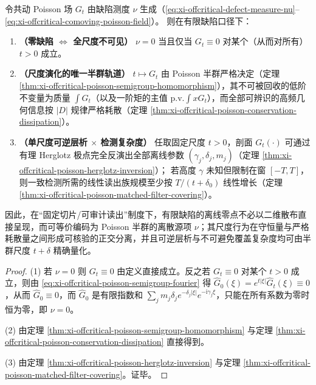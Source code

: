 \begin{corollary}\label{cor:xi-offcritical-poisson-field-classification}
令共动 Poisson 场 \(G_t\) 由缺陷测度 \(\nu\) 生成（\eqref{eq:xi-offcritical-defect-measure-nu}--\eqref{eq:xi-offcritical-comoving-poisson-field}）。
则在有限缺陷口径下：
\begin{enumerate}
  \item \textbf{（零缺陷 \(\Leftrightarrow\) 全尺度不可见）}
  \(\nu=0\) 当且仅当 \(G_t\equiv 0\) 对某个（从而对所有）\(t>0\) 成立。
  \item \textbf{（尺度演化的唯一半群轨道）}
  \(t\mapsto G_t\) 由 Poisson 半群严格决定（定理 \ref{thm:xi-offcritical-poisson-semigroup-homomorphism}），其不可被回收的低阶不变量为质量 \(\int G_t\)（以及一阶矩的主值 \(\mathrm{p.v.}\int xG_t\)），而全部可辨识的高频几何信息按 \(|D|\) 规律严格耗散（定理 \ref{thm:xi-offcritical-poisson-conservation-dissipation}）。
  \item \textbf{（单尺度可逆层析 \(\times\) 检测复杂度）}
  任取固定尺度 \(t>0\)，剖面 \(G_t(\cdot)\) 可通过有理 Herglotz 极点完全反演出全部离线参数 \((\gamma_j,\delta_j,m_j)\)（定理 \ref{thm:xi-offcritical-poisson-herglotz-inversion}）；
  若高度 \(\gamma\) 未知但限制在窗 \([-T,T]\)，则一致检测所需的线性读出族规模至少按 \(T/(t+\delta_0)\) 线性增长（定理 \ref{thm:xi-offcritical-poisson-matched-filter-covering}）。
\end{enumerate}
因此，在“固定切片/可审计读出”制度下，有限缺陷的离线零点不必以二维散布直接呈现，而可等价编码为 Poisson 半群的离散源项 \(\nu\)；其尺度行为在守恒量与严格耗散量之间形成可核验的正交分离，并且可逆层析与不可避免覆盖复杂度均可由半群尺度 \(t+\delta\) 精确量化。
\end{corollary}

\begin{proof}
(1) 若 \(\nu=0\) 则 \(G_t\equiv 0\) 由定义直接成立。反之若 \(G_t\equiv 0\) 对某个 \(t>0\) 成立，则由 \eqref{eq:xi-offcritical-poisson-semigroup-fourier} 得 \(\widehat G_0(\xi)=e^{t|\xi|}\widehat G_t(\xi)\equiv 0\)，从而 \(\widehat G_0\equiv 0\)，而 \(\widehat G_0\) 是有限指数和 \(\sum_j m_j\delta_j e^{-\delta_j|\xi|}e^{-\mathrm{i}\gamma_j\xi}\)，只能在所有系数为零时恒为零，即 \(\nu=0\)。
\par
(2) 由定理 \ref{thm:xi-offcritical-poisson-semigroup-homomorphism} 与定理 \ref{thm:xi-offcritical-poisson-conservation-dissipation} 直接得到。
\par
(3) 由定理 \ref{thm:xi-offcritical-poisson-herglotz-inversion} 与定理 \ref{thm:xi-offcritical-poisson-matched-filter-covering}。证毕。
\end{proof}

\endinput

